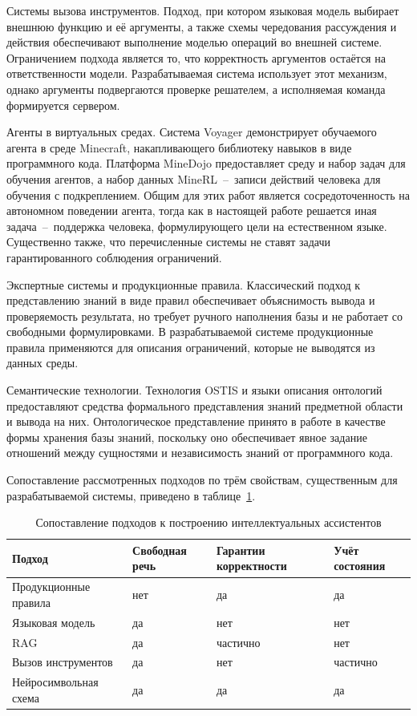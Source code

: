 Системы вызова инструментов. Подход, при котором языковая модель выбирает внешнюю
функцию и её аргументы, а также схемы чередования рассуждения и
действия обеспечивают выполнение моделью операций во внешней системе.
Ограничением подхода является то, что корректность аргументов остаётся на
ответственности модели. Разрабатываемая система использует этот механизм, однако
аргументы подвергаются проверке решателем, а исполняемая команда формируется
сервером\cite{Schick2023,Yao2023}.

Агенты в виртуальных средах. Система Voyager демонстрирует
обучаемого агента в среде Minecraft, накапливающего библиотеку навыков в виде
программного кода. Платформа MineDojo предоставляет среду и набор
задач для обучения агентов, а набор данных MineRL~--~записи
действий человека для обучения с подкреплением. Общим для этих работ является
сосредоточенность на автономном поведении агента, тогда как в настоящей работе
решается иная задача~--~поддержка человека, формулирующего цели на естественном
языке. Существенно также, что перечисленные системы не ставят задачи
гарантированного соблюдения ограничений\cite{Wang2024,Fan2022,Guss2019}.

Экспертные системы и продукционные правила. Классический подход к представлению
знаний в виде правил обеспечивает объяснимость вывода и
проверяемость результата, но требует ручного наполнения базы и не работает со
свободными формулировками. В разрабатываемой системе продукционные правила
применяются для описания ограничений, которые не выводятся из данных среды\cite{Giarratano2006}.

Семантические технологии. Технология OSTIS и языки описания
онтологий предоставляют средства формального представления
знаний предметной области и вывода на них. Онтологическое представление принято
в работе в качестве формы хранения базы знаний, поскольку оно обеспечивает явное
задание отношений между сущностями и независимость знаний от программного кода\cite{Golenkov2021,Antoniou2012}.

Сопоставление рассмотренных подходов по трём свойствам, существенным для
разрабатываемой системы, приведено в таблице~\ref{tab:approaches}.

\begin{table}[!htbp]
  \centering
  \caption{Сопоставление подходов к построению интеллектуальных ассистентов}
  \label{tab:approaches}
  \begin{tabular}{|p{}|p{}|p{}|p{}|}
    \hline
    Подход & Свободная речь & Гарантии корректности & Учёт состояния \\ \hline
    Продукционные правила & нет & да & да \\ \hline
    Языковая модель & да & нет & нет \\ \hline
    RAG & да & частично & нет \\ \hline
    Вызов инструментов & да & нет & частично \\ \hline
    Нейросимвольная схема & да & да & да \\ \hline
  \end{tabular}
\end{table}

